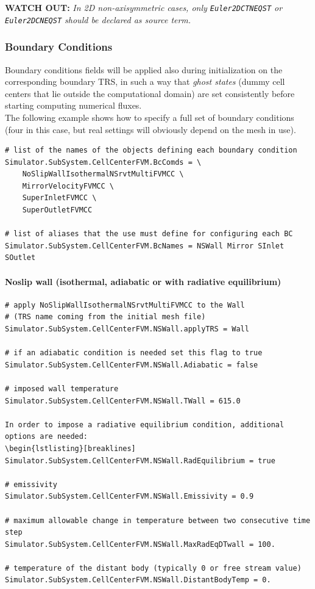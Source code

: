\documentclass[11pt]{article}
\begin{document}
{\bf WATCH OUT:} {\it In 2D non-axisymmetric cases, only {\tt Euler2DCTNEQST} or {\tt Euler2DCNEQST} should be declared as source term.}

\subsubsection{Boundary Conditions}

Boundary conditions fields will be applied also during initialization on the corresponding boundary TRS,
in such a way that {\it ghost states} (dummy cell centers that lie outside the computational domain) are set 
consistently before starting computing numerical fluxes. \\
The following example shows how to specify a full set of boundary conditions (four in this case, but 
real settings will obviously depend on the mesh in use).

\begin{lstlisting}[breaklines]
# list of the names of the objects defining each boundary condition
Simulator.SubSystem.CellCenterFVM.BcComds = \
    NoSlipWallIsothermalNSrvtMultiFVMCC \
    MirrorVelocityFVMCC \
    SuperInletFVMCC \
    SuperOutletFVMCC

# list of aliases that the use must define for configuring each BC
Simulator.SubSystem.CellCenterFVM.BcNames = NSWall Mirror SInlet SOutlet
\end{lstlisting}

\paragraph{Noslip wall (isothermal, adiabatic or with radiative equilibrium)}

\begin{lstlisting}[breaklines]
# apply NoSlipWallIsothermalNSrvtMultiFVMCC to the Wall
# (TRS name coming from the initial mesh file)
Simulator.SubSystem.CellCenterFVM.NSWall.applyTRS = Wall

# if an adiabatic condition is needed set this flag to true
Simulator.SubSystem.CellCenterFVM.NSWall.Adiabatic = false

# imposed wall temperature
Simulator.SubSystem.CellCenterFVM.NSWall.TWall = 615.0

In order to impose a radiative equilibrium condition, additional options are needed:
\begin{lstlisting}[breaklines]
Simulator.SubSystem.CellCenterFVM.NSWall.RadEquilibrium = true

# emissivity
Simulator.SubSystem.CellCenterFVM.NSWall.Emissivity = 0.9

# maximum allowable change in temperature between two consecutive time step
Simulator.SubSystem.CellCenterFVM.NSWall.MaxRadEqDTwall = 100.

# temperature of the distant body (typically 0 or free stream value)
Simulator.SubSystem.CellCenterFVM.NSWall.DistantBodyTemp = 0.
\end{lstlisting}
\end{document}
